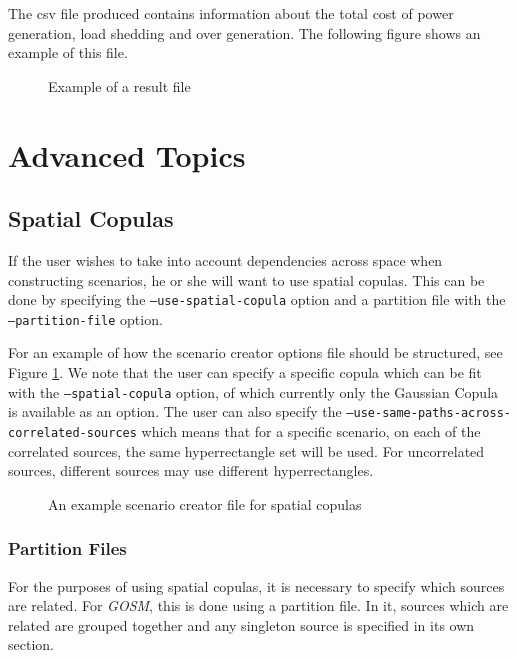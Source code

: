 \documentclass[11pt]{article}
\begin{document}
The csv file produced contains information about the total cost of power generation, load shedding and over generation. The following figure shows an example of this file.

\begin{figure}[H]
	\begin{framed}
		
	\end{framed}
	\caption{Example of a result file}
\end{figure}

\iffalse


\section{Advanced Topics}

\subsection{Spatial Copulas}
If the user wishes to take into account dependencies across space when constructing scenarios, he or she will want to use spatial copulas. This can be done by specifying the  \texttt{--use-spatial-copula} option and a partition file with the \texttt{--partition-file} option. 

For an example of how the scenario creator options file should be structured, see Figure \ref{spatial}. We note that the user can specify a specific copula which can be fit with the \texttt{--spatial-copula} option, of which currently only the Gaussian Copula is available as an option. The user can also specify the \texttt{--use-same-paths-across-correlated-sources} which means that for a specific scenario, on each of the correlated sources, the same hyperrectangle set will be used. For uncorrelated sources, different sources may use different hyperrectangles.

\begin{figure}
	\begin{framed}
	
	\end{framed}
	\caption{An example scenario creator file for spatial copulas}
	\label{spatial}
\end{figure}

\subsubsection{Partition Files}
For the purposes of using spatial copulas, it is necessary to specify which
sources are related. For \textit{GOSM}, this is done using a partition file.
In it, sources which are related are grouped together and any singleton source
is specified in its own section.
\end{document}
